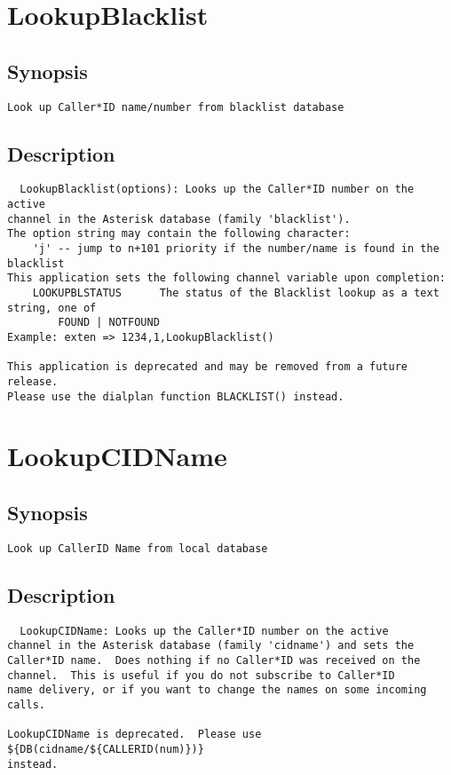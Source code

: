 \section{LookupBlacklist}
\subsection{Synopsis}
\begin{verbatim}
Look up Caller*ID name/number from blacklist database
\end{verbatim}
\subsection{Description}
\begin{verbatim}
  LookupBlacklist(options): Looks up the Caller*ID number on the active
channel in the Asterisk database (family 'blacklist').  
The option string may contain the following character:
	'j' -- jump to n+101 priority if the number/name is found in the blacklist
This application sets the following channel variable upon completion:
	LOOKUPBLSTATUS		The status of the Blacklist lookup as a text string, one of
		FOUND | NOTFOUND
Example: exten => 1234,1,LookupBlacklist()

This application is deprecated and may be removed from a future release.
Please use the dialplan function BLACKLIST() instead.

\end{verbatim}


\section{LookupCIDName}
\subsection{Synopsis}
\begin{verbatim}
Look up CallerID Name from local database
\end{verbatim}
\subsection{Description}
\begin{verbatim}
  LookupCIDName: Looks up the Caller*ID number on the active
channel in the Asterisk database (family 'cidname') and sets the
Caller*ID name.  Does nothing if no Caller*ID was received on the
channel.  This is useful if you do not subscribe to Caller*ID
name delivery, or if you want to change the names on some incoming
calls.

LookupCIDName is deprecated.  Please use ${DB(cidname/${CALLERID(num)})}
instead.

\end{verbatim}


